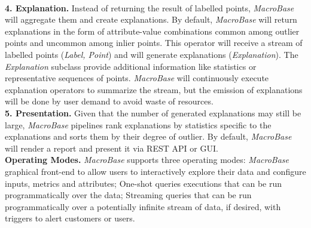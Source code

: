\documentclass[11pt, titlepage]{article}
\begin{document}
		\\\textbf{4. Explanation.} Instead of returning the result of labelled points, \textit{MacroBase} will aggregate them and create explanations. By default, \textit{MacroBase} will return explanations in the form of attribute-value combinations common among outlier points and uncommon among inlier points. This operator will receive a stream of labelled points (\textit{Label, Point}) and will generate explanations (\textit{Explanation}). The \textit{Explanation} subclass provide additional information like statistics or representative sequences of points. \textit{MacroBase} will continuously execute explanation operators to summarize the stream, but the emission of explanations will be done by user demand to avoid waste of resources.
		\\\textbf{5. Presentation.} Given that the number of generated explanations may still be large, \textit{MacroBase} pipelines rank explanations by statistics specific to the explanations and sorts them by their degree of outlier. By default, \textit{MacroBase} will render a report and present it via REST API or GUI.
		\\\textbf{Operating Modes.} \textit{MacroBase} supports three operating modes: \textit{MacroBase} graphical front-end to allow users to interactively explore their data and configure inputs, metrics and attributes; One-shot queries executions that can be run programmatically over the data; Streaming queries that can be run programmatically over a potentially infinite stream of data, if desired, with triggers to alert customers or users.
\end{document}
